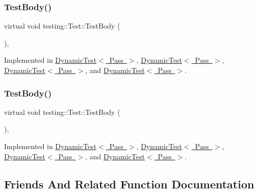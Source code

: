 \subsubsection{\texorpdfstring{TestBody()}{TestBody()}\hspace{0.1cm}{\footnotesize\ttfamily [2/3]}}
{\footnotesize\ttfamily virtual void testing\+::\+Test\+::\+Test\+Body (\begin{DoxyParamCaption}{ }\end{DoxyParamCaption})\hspace{0.3cm}{\ttfamily [private]}, {}}



Implemented in \mbox{\hyperlink{class_dynamic_test_afc4a0a94673a3d37709f9cd03e82b821}{Dynamic\+Test$<$ Pass $>$}}, \mbox{\hyperlink{class_dynamic_test_afc4a0a94673a3d37709f9cd03e82b821}{Dynamic\+Test$<$ Pass $>$}}, \mbox{\hyperlink{class_dynamic_test_afc4a0a94673a3d37709f9cd03e82b821}{Dynamic\+Test$<$ Pass $>$}}, and \mbox{\hyperlink{class_dynamic_test_afc4a0a94673a3d37709f9cd03e82b821}{Dynamic\+Test$<$ Pass $>$}}.

\mbox{\label{classtesting_1_1_test_a146a4a5d9854e676d625a0ef67409794}} 
\subsubsection{\texorpdfstring{TestBody()}{TestBody()}\hspace{0.1cm}{\footnotesize\ttfamily [3/3]}}
{\footnotesize\ttfamily virtual void testing\+::\+Test\+::\+Test\+Body (\begin{DoxyParamCaption}{ }\end{DoxyParamCaption})\hspace{0.3cm}{\ttfamily [private]}, {}}



Implemented in \mbox{\hyperlink{class_dynamic_test_afc4a0a94673a3d37709f9cd03e82b821}{Dynamic\+Test$<$ Pass $>$}}, \mbox{\hyperlink{class_dynamic_test_afc4a0a94673a3d37709f9cd03e82b821}{Dynamic\+Test$<$ Pass $>$}}, \mbox{\hyperlink{class_dynamic_test_afc4a0a94673a3d37709f9cd03e82b821}{Dynamic\+Test$<$ Pass $>$}}, and \mbox{\hyperlink{class_dynamic_test_afc4a0a94673a3d37709f9cd03e82b821}{Dynamic\+Test$<$ Pass $>$}}.



\subsection{Friends And Related Function Documentation}
\mbox{\label{classtesting_1_1_test_aed3c96e2bd5a46339c1cbe49a4a233ee}} 
